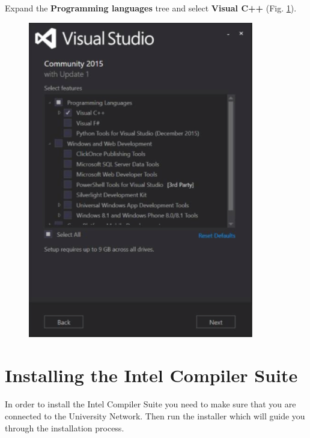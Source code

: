 \documentclass[10pt,a4paper,oneside]{article}
\begin{document}
Expand the \textbf{Programming languages} tree and select \textbf{Visual C++} (Fig. \ref{fig:VS2}).
\begin{figure}[ht]
\centering
\includegraphics[scale=0.45]{VS2.png}
\caption{}
\label{fig:VS2}
\end{figure}

\section*{Installing the Intel Compiler Suite}
In order to install the Intel Compiler Suite you need to make sure that you are connected to the University Network. Then run the installer which will guide you through the installation process. 
\end{document}

